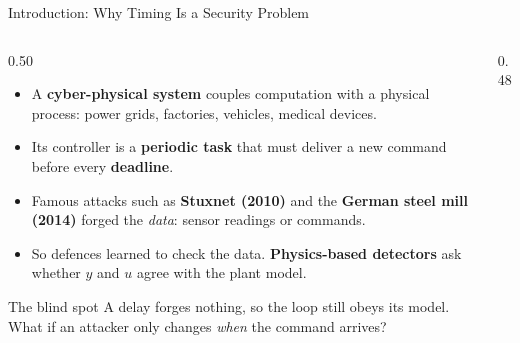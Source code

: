 \documentclass[9pt,aspectratio=169]{beamer}
\begin{document}
\begin{frame}{Introduction: Why Timing Is a Security Problem}
\begin{columns}[T]
\begin{column}{0.50\textwidth}
\begin{itemize}\setlength\itemsep{0.4em}
  \item A \textbf{cyber-physical system} couples computation with a physical process: power grids, factories, vehicles, medical devices.
  \item Its controller is a \textbf{periodic task} that must deliver a new command before every \textbf{deadline}.
  \item Famous attacks such as \textbf{Stuxnet (2010)} and the \textbf{German steel mill (2014)} forged the \emph{data}: sensor readings or commands.
  \item So defences learned to check the data. \textbf{Physics-based detectors} ask whether $y$ and $u$ agree with the plant model.
\end{itemize}
\vspace{0.3em}
\begin{alertblock}{The blind spot}
A delay forges nothing, so the loop still obeys its model. What if an attacker only changes \emph{when} the command arrives?
\end{alertblock}
\end{column}
\begin{column}{0.48\textwidth}
\centering
\FigBlindSpot
\end{column}
\end{columns}
\end{frame}
\end{document}
